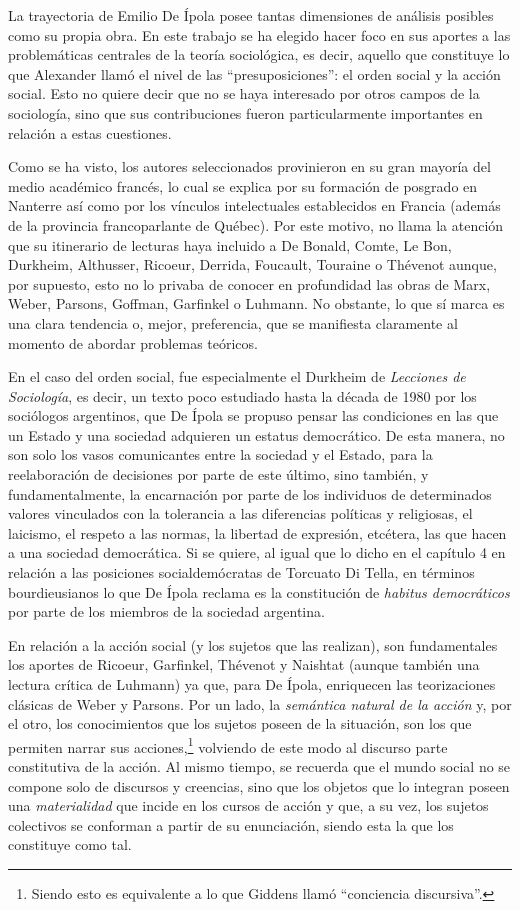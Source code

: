 {La trayectoria de Emilio De Ípola posee tantas dimensiones de análisis posibles como su propia obra. En este trabajo se ha elegido hacer foco en sus aportes a las problemáticas centrales de la teoría sociológica, es decir, aquello que constituye lo que Alexander llamó el nivel de las \enquote{presuposiciones}: el orden social y la acción social. Esto no quiere decir que no se haya interesado por otros campos de la sociología, sino que sus contribuciones fueron particularmente importantes en relación a estas cuestiones.

Como se ha visto, los autores seleccionados provinieron en su gran mayoría del medio académico francés, lo cual se explica por su formación de posgrado en Nanterre así como por los vínculos intelectuales establecidos en Francia (además de la provincia francoparlante de Québec). Por este motivo, no llama la atención que su itinerario de lecturas haya incluido a De Bonald, Comte, Le Bon, Durkheim, Althusser, Ricoeur, Derrida, Foucault, Touraine o Thévenot aunque, por supuesto, esto no lo privaba de conocer en profundidad las obras de Marx, Weber, Parsons, Goffman, Garfinkel o Luhmann. No obstante, lo que sí marca es una clara tendencia o, mejor, preferencia, que se manifiesta claramente al momento de abordar problemas teóricos.

En el caso del orden social, fue especialmente el Durkheim de \emph{Lecciones de Sociología}, es decir, un texto poco estudiado hasta la década de 1980 por los sociólogos argentinos, que De Ípola se propuso pensar las condiciones en las que un Estado y una sociedad adquieren un estatus democrático. De esta manera, no son solo los vasos comunicantes entre la sociedad y el Estado, para la reelaboración de decisiones por parte de este último, sino también, y fundamentalmente, la encarnación por parte de los individuos de determinados valores vinculados con la tolerancia a las diferencias políticas y religiosas, el laicismo, el respeto a las normas, la libertad de expresión, etcétera, las que hacen a una sociedad democrática. Si se quiere, al igual que lo dicho en el capítulo 4 en relación a las posiciones socialdemócratas de Torcuato Di Tella, en términos bourdieusianos lo que De Ípola reclama es la constitución de \emph{habitus democráticos} por parte de los miembros de la sociedad argentina.

En relación a la acción social (y los sujetos que las realizan), son fundamentales los aportes de Ricoeur, Garfinkel, Thévenot y Naishtat (aunque también una lectura crítica de Luhmann) ya que, para De Ípola, enriquecen las teorizaciones clásicas de Weber y Parsons. Por un lado, la \emph{semántica natural de la acción} y, por el otro, los conocimientos que los sujetos poseen de la situación, son los que permiten narrar sus acciones,\footnote{Siendo esto es equivalente a lo que Giddens llamó \enquote{conciencia discursiva}.} volviendo de este modo al discurso parte constitutiva de la acción. Al mismo tiempo, se recuerda que el mundo social no se compone solo de discursos y creencias, sino que los objetos que lo integran poseen una \emph{materialidad} que incide en los cursos de acción y que, a su vez, los sujetos colectivos se conforman a partir de su enunciación, siendo esta la que los constituye como tal.

}
